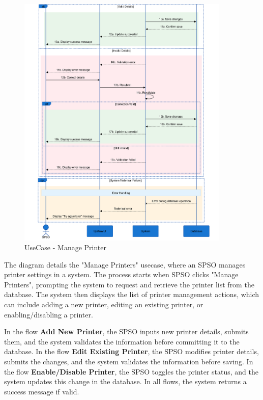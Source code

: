 \documentclass[a4paper]{report}
\begin{document}
\begin{figure}[H]
    \centering
    \includegraphics[width=0.9\textwidth ]{images/sequence_diagram/Manage Printers_2.png}
    \caption{UseCase - Manage Printer}
    \label{fig:manage_printer}
\end{figure}

The diagram details the "Manage Printers" usecase, where an SPSO manages printer settings in a system. The process starts when SPSO clicks "Manage Printers", prompting the system to request and retrieve the printer list from the database. The system then displays the list of printer management actions, which can include adding a new printer, editing an existing printer, or enabling/disabling a printer.

In the flow \textbf{Add New Printer}, the SPSO inputs new printer details, submits them, and the system validates the information before committing it to the database. 
In the flow \textbf{Edit Existing Printer}, the SPSO modifies printer details, submits the changes, and the system validates the information before saving. 
In the flow \textbf{Enable/Disable Printer}, the SPSO toggles the printer status, and the system updates this change in the database. In all flows, the system returns a success message if valid.
\end{document}
